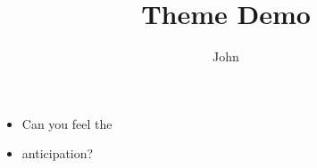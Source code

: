 \documentclass{beamer}
\title{Theme Demo}
\author{John}
\begin{document}
\begin{frame}
\titlepage
\end{frame}

\begin{frame}
\begin{itemize}
\item Can you feel the
\pause \item anticipation?
\end{itemize}
\end{frame}
\end{document}

